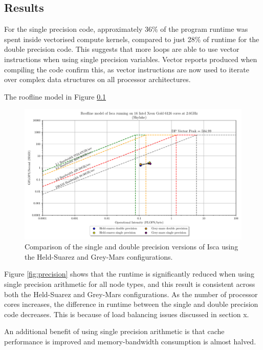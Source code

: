 \documentclass[a4paper,11pt]{report}
\begin{document}
\subsection{Results}
For the single precision code, approximately 36\% of the program runtime was spent inside vectorised compute kernels, compared to just 28\% of runtime for the double precision code. This suggests that more loops are able to use vector instructions when using single precision variables. Vector reports produced when compiling the code confirm this, as vector instructions are now used to iterate over complex data structures on all processor architectures. 
\par
The roofline model in Figure \ref{}
\par
\begin{figure}[htbp]
\begin{center}
\includegraphics[width=\textwidth]{img/roofline_model_bluepebble_precision.pdf}
\caption[Roofline model comparing single and double precision arithmetic]{Comparison of the single and double precision versions of Isca using the Held-Suarez and Grey-Mars configurations.}
\label{default}
\end{center}
\end{figure}
\par
Figure \ref{fig:precision} shows that the runtime is significantly reduced when using single precision arithmetic for all node types, and this result is consistent across both the Held-Suarez and Grey-Mars configurations. As the number of processor cores increases, the difference in runtime between the single and double precision code decreases. This is because of load balancing issues discussed in section x.
\par 
An additional benefit of using single precision arithmetic is that cache performance is improved and memory-bandwidth consumption is almost halved. 
 
\end{document}
